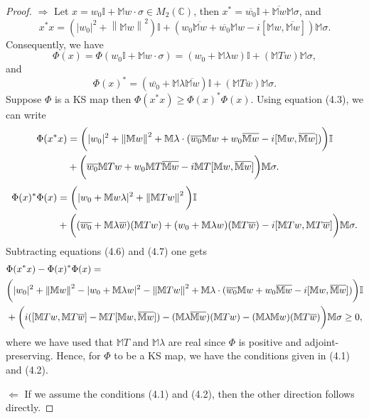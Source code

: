 \documentclass[11pt,reqno]{amsart}
\theoremstyle{definition}
\numberwithin{equation}{section} \setcounter{tocdepth}{1}
\def\bm{{\mathbb M}}
\newcommand{\norm}[1]{\left \lVert #1 \right \rVert}
\numberwithin{equation}{section}
\begin{document}
\begin{proof}
    $\Rightarrow$
    Let $x=w_0\mathbb{I}+\bm{w\cdot \sigma} \in M_2(\mathbb{C})$, then $x^*=\overline{w_0}\mathbb{I}+\overline{\bm{w}}\bm{\sigma}$, and \begin{equation}
        x^*x=(|w_0|^2+\norm{\bm{w}}^2)\mathbb{I}+(w_0\overline{\bm{w}}+\overline{w_0}\bm{w}-i[\bm{w},\overline{\bm{w}}])\bm{\sigma}.
    \end{equation}
    Consequently, we have \begin{equation}
        \Phi(x)=\Phi(w_0\mathbb{I}+\bm{w\cdot \sigma})=(w_0+\bm{\lambda w})\mathbb{I}+(\bm{Tw})\bm{\sigma},
    \end{equation} and \begin{equation}
        \Phi(x)^*=(\overline{w_0}+\bm{\lambda}\overline{\bm{w}})\mathbb{I}+(\bm{T\overline{w}})\bm{\sigma}.
    \end{equation} Suppose $\Phi$ is a KS map then $\Phi(x^*x) \geq \Phi(x)^*\Phi(x).$ Using equation (4.3), we can write
    \begin{align}
       \Phi(x^*x)&=\bigg(|w_0|^2+\norm{\bm{w}}^2+\bm{\lambda} \cdot (\overline{w_0}\bm{w}+w_0\overline{\bm{w}}-i[\bm{w},\overline{\bm{w}}])\bigg)\mathbb{I} \notag \\
       &+\bigg(\overline{w_0}\bm{Tw}+w_0\bm{T}\overline{\bm{w}}-i\bm{T}[\bm{w},\overline{\bm{w}}]\bigg)\bm{\sigma}.
    \end{align}
    \begin{align}
\Phi(x)^*\Phi(x)&=\bigg(|w_0+\bm{w\lambda}|^2+\norm{\bm{Tw}}^2\bigg)\mathbb{I} \notag \\
&+\bigg((\overline{w_0}+\bm{\lambda \overline{w}})(\bm{Tw})+(w_0+\bm{\lambda w})(\bm{T\overline{w}})-i[\bm{Tw},\bm{T\overline{w}}]\bigg)\bm{\sigma}.
    \end{align}Subtracting equations (4.6) and (4.7) one gets
    \begin{align}
        &\Phi(x^*x)-\Phi(x)^*\Phi(x)= \notag \\
        &\bigg(|w_0|^2+\norm{\bm{w}}^2-|w_0+\bm{\lambda w}|^2-\norm{\bm{Tw}}^2+\bm{\lambda} \cdot (\overline{w_0}\bm{w}+w_0\overline{\bm{w}}-i[\bm{w},\overline{\bm{w}}])\bigg)\mathbb{I} \notag\\
        &+\bigg(i([\bm{Tw},\bm{T\overline{w}}]-\bm{T}[\bm{w},\overline{\bm{w}}])-(\bm{\lambda}\overline{\bm{w}})(\bm{Tw})-(\bm{\lambda}\bm{w})(\bm{T\overline{w}})\bigg)\bm{\sigma} \geq 0,
    \end{align}where we have used that $\bm{T}$ and $\bm{\lambda}$ are real since $\Phi$ is positive and adjoint-preserving. Hence, for $\Phi$ to be a KS map, we have the conditions given in (4.1) and (4.2).

    $\Leftarrow$ If we assume the conditions (4.1) and (4.2), then the other direction follows directly.
\end{proof}
\end{document}
